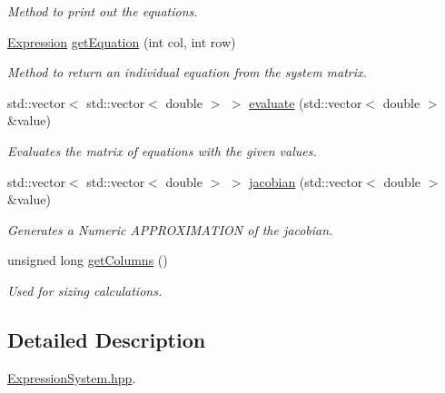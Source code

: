 \begin{DoxyCompactItemize}
\begin{DoxyCompactList}\small\item\em Method to print out the equations. \end{DoxyCompactList}\item 
\hyperlink{class_expression}{Expression} \hyperlink{class_expression_system_a9b90526a70c5b8c823c7d9e76a969182}{get\+Equation} (int col, int row)
\begin{DoxyCompactList}\small\item\em Method to return an individual equation from the system matrix. \end{DoxyCompactList}\item 
std\+::vector$<$ std\+::vector$<$ double $>$ $>$ \hyperlink{class_expression_system_adb8ad5aa9fa197661d80551bf7ffeb34}{evaluate} (std\+::vector$<$ double $>$ \&value)
\begin{DoxyCompactList}\small\item\em Evaluates the matrix of equations with the given values. \end{DoxyCompactList}\item 
std\+::vector$<$ std\+::vector$<$ double $>$ $>$ \hyperlink{class_expression_system_a998e156508feb8700024858f97368e3d}{jacobian} (std\+::vector$<$ double $>$ \&value)
\begin{DoxyCompactList}\small\item\em Generates a Numeric A\+P\+P\+R\+O\+X\+I\+M\+A\+T\+I\+ON of the jacobian. \end{DoxyCompactList}\item 
unsigned long \hyperlink{class_expression_system_a7781ceb2775aeaae0f7ed6d304ff7397}{get\+Columns} ()
\begin{DoxyCompactList}\small\item\em Used for sizing calculations. \end{DoxyCompactList}\end{DoxyCompactItemize}


\subsection{Detailed Description}
\hyperlink{_expression_system_8hpp_source}{Expression\+System.\+hpp}. 

